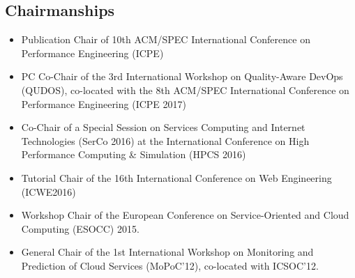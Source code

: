 \documentclass[paper=letter,fontsize=11pt]{scrartcl} %
\begin{document}
\subsection*{Chairmanships}
\begin{itemize}
\item Publication Chair of 10th ACM/SPEC International Conference on Performance Engineering (ICPE)
\item PC Co-Chair of the  3rd International Workshop on Quality-Aware DevOps (QUDOS), co-located with the  8th ACM/SPEC International Conference on Performance Engineering (ICPE 2017)
\item Co-Chair of a Special Session on Services Computing and Internet Technologies (SerCo 2016) at the International Conference on High Performance Computing \& Simulation (HPCS 2016)
\item Tutorial Chair of the 16th International Conference on Web Engineering (ICWE2016)
\item Workshop Chair of the European Conference on Service-Oriented
and Cloud Computing (ESOCC) 2015.
\item General Chair of the 1st International Workshop on Monitoring and
Prediction of Cloud Services (MoPoC'12), co-located with ICSOC'12.
\end{itemize}
\end{document}
